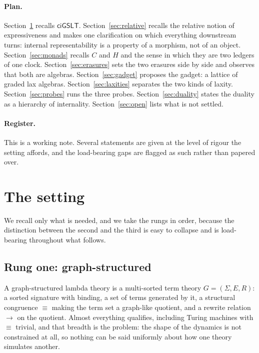\documentclass[11pt,a4paper]{article}
\theoremstyle{definition}
\theoremstyle{plain}
\theoremstyle{remark}
\newcommand{\ciG}{\mathsf{ciGSLT}}
\begin{document}
\paragraph{Plan.} Section~\ref{sec:setting} recalls $\ciG$. Section~\ref{sec:relative} recalls the
relative notion of expressiveness and makes one clarification on which everything downstream turns:
internal representability is a property of a morphism, not of an object.
Section~\ref{sec:monads} recalls $C$ and $H$ and the sense in which they are two ledgers of one
clock. Section~\ref{sec:erasures} sets the two erasures side by side and observes that both are
algebras. Section~\ref{sec:gadget} proposes the gadget: a lattice of graded lax algebras.
Section~\ref{sec:laxities} separates the two kinds of laxity. Section~\ref{sec:probes} runs the
three probes. Section~\ref{sec:duality} states the duality as a hierarchy of internality.
Section~\ref{sec:open} lists what is not settled.

\paragraph{Register.} This is a working note. Several statements are given at the level of rigour
the setting affords, and the load-bearing gaps are flagged as such rather than papered over.

\section{The setting}
\label{sec:setting}

We recall only what is needed, and we take the rungs in order, because the distinction between the
second and the third is easy to collapse and is load-bearing throughout what follows.

\subsection{Rung one: graph-structured}

A graph-structured lambda theory is a multi-sorted term theory $G = (\Sigma, E, R)$: a sorted
signature with binding, a set of terms generated by it, a structural congruence $\equiv$ making the
term set a graph-like quotient, and a rewrite relation $\to$ on the quotient. Almost everything
qualifies, including Turing machines with $\equiv$ trivial, and that breadth is the problem: the
shape of the dynamics is not constrained at all, so nothing can be said uniformly about how one
theory simulates another.
\end{document}

